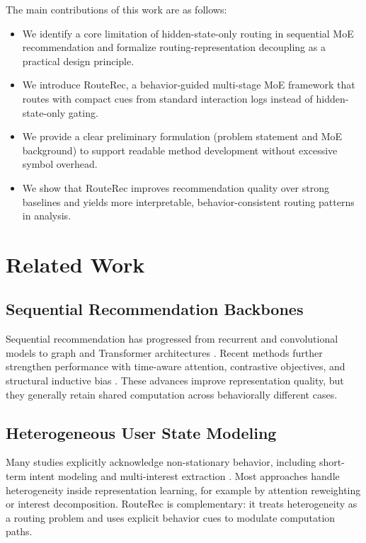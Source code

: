 \documentclass[sigconf,review,anonymous]{acmart}
\begin{document}
The main contributions of this work are as follows:
\begin{itemize}
  \item We identify a core limitation of hidden-state-only routing in sequential MoE recommendation and formalize routing-representation decoupling as a practical design principle.
  \item We introduce RouteRec, a behavior-guided multi-stage MoE framework that routes with compact cues from standard interaction logs instead of hidden-state-only gating.
  \item We provide a clear preliminary formulation (problem statement and MoE background) to support readable method development without excessive symbol overhead.
  \item We show that RouteRec improves recommendation quality over strong baselines and yields more interpretable, behavior-consistent routing patterns in analysis.
\end{itemize}

\section{Related Work}
\label{sec:related}

\subsection{Sequential Recommendation Backbones}
Sequential recommendation has progressed from recurrent and convolutional models to graph and Transformer architectures \cite{hidasi2016gru4rec,tang2018caser,wu2019srgnn,kang2018sasrec,sun2019bert4rec}. Recent methods further strengthen performance with time-aware attention, contrastive objectives, and structural inductive bias \cite{li2020tisasrec,xie2020cl4srec,wang2023multiplecontrast,qiu2022duorec,du2023fearec,shin2024bsarec,liu2025sigma}. These advances improve representation quality, but they generally retain shared computation across behaviorally different cases.

\subsection{Heterogeneous User State Modeling}
Many studies explicitly acknowledge non-stationary behavior, including short-term intent modeling and multi-interest extraction \cite{li2017narm,liu2018stamp,ying2018shan,ma2019hgn,li2019mind,cen2020comirec}. Most approaches handle heterogeneity inside representation learning, for example by attention reweighting or interest decomposition. RouteRec is complementary: it treats heterogeneity as a routing problem and uses explicit behavior cues to modulate computation paths.
\end{document}
